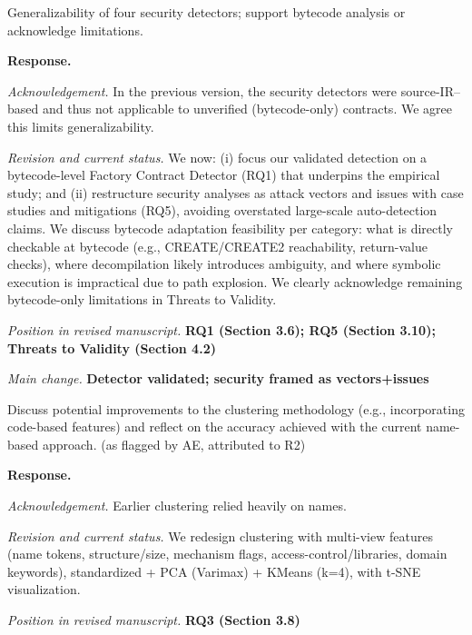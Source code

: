 \documentclass[acmsmall]{acmart}
\begin{document}
	\begin{tcolorbox}
		[commentbox,title=Reviewer \#2 -- Comment 2] Generalizability of four security detectors;
		support bytecode analysis or acknowledge limitations.
	\end{tcolorbox}

	\noindent
	\textbf{Response.}

	\textit{Acknowledgement.} In the previous version, the security detectors were source-IR–based
	and thus not applicable to unverified (bytecode-only) contracts. We agree this limits generalizability.

	\textit{Revision and current status.} We now: (i) focus our validated detection on a bytecode-level
	Factory Contract Detector (RQ1) that underpins the empirical study; and (ii) restructure
	security analyses as attack vectors and issues with case studies and mitigations (RQ5), avoiding
	overstated large-scale auto-detection claims. We discuss bytecode adaptation feasibility per
	category: what is directly checkable at bytecode (e.g., CREATE/CREATE2 reachability, return-value
	checks), where decompilation likely introduces ambiguity, and where symbolic execution is
	impractical due to path explosion. We clearly acknowledge remaining bytecode-only limitations in
	Threats to Validity.

	\textit{Position in revised manuscript.}
	{\color{red}\textbf{RQ1 (Section 3.6); RQ5 (Section 3.10); Threats to Validity (Section 4.2)}}

	\textit{Main change.}
	{\color{blue}\textbf{Detector validated; security framed as vectors+issues}}

	\begin{tcolorbox}
		[commentbox,title=Reviewer \#2 -- Comment 2] Discuss potential improvements to the clustering
		methodology (e.g., incorporating code-based features) and reflect on the accuracy achieved with
		the current name-based approach. (as flagged by AE, attributed to R2)
	\end{tcolorbox}

	\noindent
	\textbf{Response.}

	\textit{Acknowledgement.} Earlier clustering relied heavily on names.

	\textit{Revision and current status.} We redesign clustering with multi-view features (name tokens,
	structure/size, mechanism flags, access-control/libraries, domain keywords), standardized + PCA (Varimax)
	+ KMeans (k=4), with t-SNE visualization.

	\textit{Position in revised manuscript.} {\color{red}\textbf{RQ3 (Section 3.8)}}
\end{document}
